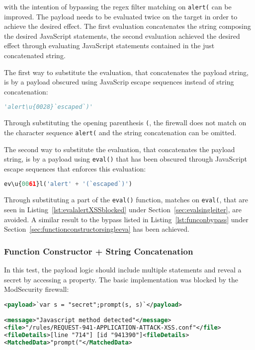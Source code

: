with the intention of bypassing the regex filter matching on \verb|alert(| can be improved. The payload needs to be evaluated twice on the target in order to achieve the desired effect. The first evaluation concatenates the string composing the desired JavaScript statements, the second evaluation achieved the desired effect through evaluating JavaScript statements contained in the just concatenated string. 

The first way to substitute the evaluation, that concatenates the payload string, is by a payload obscured using JavaScrip escape sequences instead of string concatenation:

\begin{lstlisting}[style=basicStyle, language=Python, caption='alert\textbackslash u\{0028\}`escaped`) bypass]
'alert\u{0028}`escaped`)'
\end{lstlisting}

Through substituting the opening parenthesis \verb|(|, the firewall does not match on the character sequence \verb|alert(| and the string concatenation can be omitted.

The second way to substitute the evaluation, that concatenates the payload string, is by a payload using \verb|eval()| that has been obscured through JavaScript escape sequences that enforces this evaluation:

\begin{lstlisting}[style=basicStyle, language=Python, caption='ev\textbackslash u\{0061\}l('alert' + '(`escaped`)') bypass]
ev\u{0061}l('alert' + '(`escaped`)')
\end{lstlisting}

Through substituting a part of the \verb|eval()| function, matches on \verb|eval(|, that are seen in Listing~\ref{lst:evalalertXSSblocked} under Section~\ref{sec:evalsingleiter}, are avoided. A similar result to the bypass listed in Listing~\ref{lst:funconbypass} under Section~\ref{sec:functionconstructorsingleeva} has been achieved.



\subsubsection{Function Constructor + String Concatenation}
\label{sec:funconstrconbypass}
In this test, the payload logic should include multiple statements and reveal a secret by accessing a property.
The basic implementation was blocked by the ModSecurity firewall:

\begin{lstlisting}[style=ruleStyle, language=XML, caption=prompt blocked, label={lst:promptblocked}]
<payload>`var s = "secret";prompt(s, s)`</payload>

<message>"Javascript method detected"</message>
<file>"/rules/REQUEST-941-APPLICATION-ATTACK-XSS.conf"</file>
<fileDetails>[line "714"] [id "941390"]<fileDetails>
<MatchedData>"prompt("</MatchedData>
\end{lstlisting}

